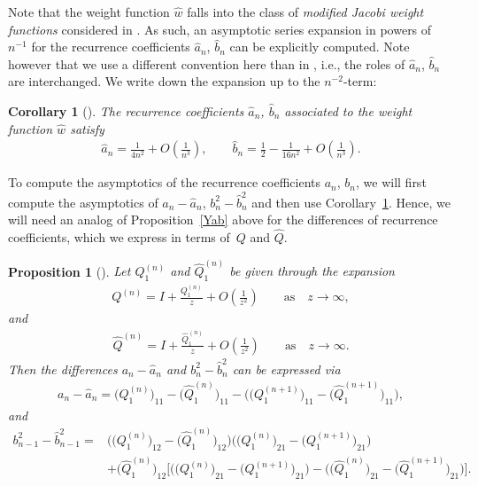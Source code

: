 \documentclass[11pt]{article}
\numberwithin{equation}{section}
\newcommand{\Id}{I}
\newcommand{\hw}{\widehat w}
\newcommand{\bQ}{ Q}
\newcommand{\hQ}{{\widehat Q}}
\newtheorem{Corollary}[Theorem]{Corollary}
\newtheorem{Proposition}[Theorem]{Proposition}
 { \theoremstyle{definition}
\newtheorem{Definition}[Theorem]{Definition}
\newtheorem{Note}[Theorem]{Note}
\newtheorem{Example}[Theorem]{Example}
\newtheorem{Remark}[Theorem]{Remark} }
\numberwithin{equation}{section}
\begin{document}
Note that the weight function $\hw$ falls into the class of \emph{modified Jacobi weight functions} considered in \cite{KMVV}. As such, an asymptotic series expansion in powers of $n^{-1}$ for the recurrence coefficients $\widehat a_n$, $\widehat b_n$ can be explicitly computed. Note however that we use a different convention here than in \cite{KMVV}, i.e., the roles of $\widehat a_n$, $\widehat b_n$ are interchanged. We write down the expansion up to the $n^{-2}$-term:
\begin{Corollary}[{\cite[Theorem.~1.10]{KMVV}}]\label{AsymptoticsHatRC}
The recurrence coefficients $\widehat a_n$, $\widehat b_n$ associated to the weight function $\hw$ satisfy
\begin{align*}
 \widehat a_n= \frac{1}{4n^2} + O\left(\frac{1}{n^3}\right),\qquad \widehat b_n = \frac{1}{2}-\frac{1}{16n^2} + O\left(\frac{1}{n^3}\right).
\end{align*}
\end{Corollary}
To compute the asymptotics of the recurrence coefficients $a_n$, $b_n$, we will first compute the asymptotics of $a_n -\widehat a_n$, $b_n^2-\widehat b_n^2$ and then use Corollary~\ref{AsymptoticsHatRC}. Hence, we will need an analog of Proposition~\ref{Yab} above for the differences of recurrence coefficients, which we express in terms of~$Q$ and $\hQ$.
\begin{Proposition}[{\cite[Proposition~3.6]{CD}}]\label{PropRecQ}
 Let $Q_1^{(n)}$ and $\hQ_1^{(n)}$ be given through the expansion
 \begin{align*}
 Q^{(n)} = \Id + \frac{Q_1^{(n)}}{z} + O\left(\frac{1}{z^2}\right) \qquad \text{as} \quad z\to\infty,
 \end{align*}
 and
 \begin{align*}
 \hQ^{(n)} = \Id + \frac{\hQ_1^{(n)}}{z} + O\left(\frac{1}{z^2}\right) \qquad \text{as} \quad z\to\infty.
 \end{align*}
Then the differences $a_n - \widehat a_n$ and $b_n^2 -\widehat b_n^2$ can be expressed via
\begin{align}\label{a_n-widehat a_n}
 a_n - \widehat a_n = \big(Q_1^{(n)}\big)_{11}-\big(\hQ_1^{(n)}\big)_{11} - \big(\big(Q_1^{(n+1)}\big)_{11}-\big(\hQ_1^{(n+1)}\big)_{11}\big),
\end{align}
and
\begin{align}\nonumber
 b_{n-1}^2-\widehat b_{n-1}^2 ={}& \big(\big(\bQ_1^{(n)}\big)_{12}-\big(\hQ_1^{(n)}\big)_{12}\big)\big(\big(\bQ_1^{(n)}\big)_{21}-\big(\bQ_1^{(n+1)}\big)_{21}\big)
 \\\label{b_n^2-widehat b_n^2}
 &+ \big( \hQ_1^{(n)}\big)_{12}\big[\big(\big(\bQ_1^{(n)}\big)_{21}-\big(\bQ_1^{(n+1)}\big)_{21}\big)-\big(\big(\hQ_1^{(n)}\big)_{21}-\big(\hQ_1^{(n+1)}\big)_{21}\big)\big].
\end{align}
\end{Proposition}
\end{document}
